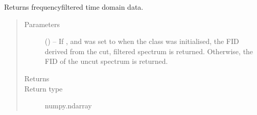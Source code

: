 \documentclass[letterpaper,10pt,english]{sphinxmanual}
\begin{document}
\begin{fulllineitems}
\begin{fulllineitems}
\begin{quote}
\begin{description}
\end{description}\end{quote}

\end{fulllineitems}


\begin{fulllineitems}
\label{\detokenize{references/freqfilter:nmrespy.freqfilter.FrequencyFilter.get_fid}}
\sphinxAtStartPar
Returns frequency\sphinxhyphen{}filtered time domain data.
\begin{quote}\begin{description}
\item[{Parameters}] \leavevmode
\sphinxAtStartPar
{} (\sphinxstyleliteralemphasis{\sphinxupquote{, }}) – If , and  was set to  when the class was
initialised, the FID derived from the cut, filtered spectrum is
returned. Otherwise, the FID of the uncut spectrum is returned.

\item[{Returns}] \leavevmode
\sphinxAtStartPar
{}

\item[{Return type}] \leavevmode
\sphinxAtStartPar
numpy.ndarray

\end{description}\end{quote}

\end{fulllineitems}



\end{fulllineitems}
\end{document}

